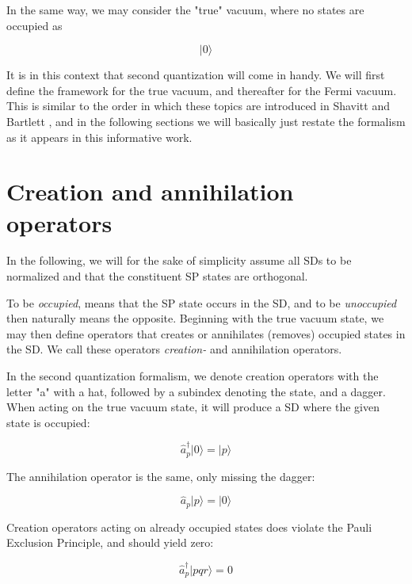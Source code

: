 In the same way, we may consider the "true" vacuum, where no states are occupied as

\begin{equation}
 \vert 0 \rangle
\label{eqn:truevacuum}
\end{equation}

It is in this context that second quantization will come in handy. We will first define the framework for the true vacuum, and thereafter for the Fermi vacuum. This is similar to the order in which these topics are introduced in Shavitt and Bartlett \cite{ShavittBartlett2009}, and in the following sections we will basically just restate the formalism as it appears in this informative work.

\section{Creation and annihilation operators}

In the following, we will for the sake of simplicity assume all SDs to be normalized and that the constituent SP states are orthogonal. 

To be \emph{occupied}, means that the SP state occurs in the SD, and to be \emph{unoccupied} then naturally means the opposite. Beginning with the true vacuum state, we may then define operators that creates or annihilates (removes) occupied states in the SD. We call these operators \emph{creation-} and {annihilation} operators. 

In the second quantization formalism, we denote creation operators with the letter "a" with a hat, followed by a subindex denoting the state, and a dagger. When acting on the true vacuum state, it will produce a SD where the given state is occupied:

\begin{equation}
\hat{a}_p^\dagger \vert 0 \rangle = \vert p \rangle
\label{eqn:creation}
\end{equation}

The annihilation operator is the same, only missing the dagger:

\begin{equation}
\hat{a}_p \vert p \rangle = \vert 0 \rangle
\label{eqn:annihilation}
\end{equation}



Creation operators acting on already occupied states does violate the Pauli Exclusion Principle, and should yield zero:

\begin{equation}
\hat{a}_p^\dagger \vert pqr \rangle = 0
\label{eqn:createExclusion}
\end{equation}

